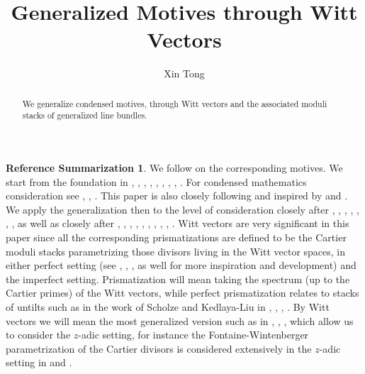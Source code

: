 \documentclass[12pt]{article}
\theoremstyle{definition}
\newtheorem{reference}{Reference Summarization}
\begin{document}
\title{Generalized Motives through Witt Vectors}
\author{Xin Tong}
\date{}

\maketitle

\begin{abstract}
\noindent We generalize condensed motives, through Witt vectors and the associated moduli stacks of generalized line bundles.

\end{abstract}

\newpage
\tableofcontents


\newpage





\begin{reference}
We follow \cite{G} on the corresponding motives. We start from the foundation in \cite{BSI}, \cite{BLI}, \cite{DI}, \cite{SchI}, \cite{ALBRCS}, \cite{TI}, \cite{TII}, \cite{TIII}, \cite{TVI}. For condensed mathematics consideration see \cite{CS1}, \cite{CS2}, \cite{CS3}. This paper is also closely following and inspired by \cite{TIV} and \cite{TV}. We apply the generalization then to the level of consideration closely after \cite{Ta}, \cite{FI}, \cite{KLI}, \cite{KLII}, \cite{SchII}, \cite{SchIII}, \cite{SchIV}, as well as closely after \cite{L}, \cite{FS}, \cite{DHKM}, \cite{VL}, \cite{LL}, \cite{EGH}, \cite{DIII}, \cite{DII}, \cite{Z}, \cite{GL}. Witt vectors are very significant in this paper since all the corresponding prismatizations are defined to be the Cartier moduli stacks parametrizing those divisors living in the Witt vector spaces, in either perfect setting (see \cite{SchIII}, \cite{SchII}, \cite{KLI}, \cite{KLII} as well for more inspiration and development) and the imperfect setting. Prismatization will mean taking the spectrum (up to the Cartier primes) of the Witt vectors, while perfect prismatization relates to stacks of untilts such as in the work of Scholze and Kedlaya-Liu in \cite{SchIII}, \cite{SchII}, \cite{KLI}, \cite{KLII}. By Witt vectors we will mean the most generalized version such as in \cite{KLI}, \cite{KLII}, \cite{FS}, which allow us to consider the $z$-adic setting, for instance the Fontaine-Wintenberger parametrization of the Cartier divisors is considered extensively in the $z$-adic setting in \cite{KLI} and \cite{KLII}.
\end{reference}
\end{document}
